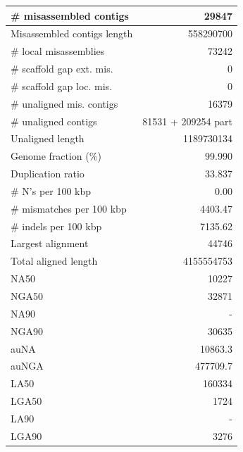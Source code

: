 \documentclass[12pt,a4paper]{article}
\begin{document}
\begin{table}[ht]
\begin{center}
\begin{tabular}{|l*{1}{|r}|}
\# misassembled contigs & 29847 \\ \hline
Misassembled contigs length & 558290700 \\ \hline
\# local misassemblies & 73242 \\ \hline
\# scaffold gap ext. mis. & 0 \\ \hline
\# scaffold gap loc. mis. & 0 \\ \hline
\# unaligned mis. contigs & 16379 \\ \hline
\# unaligned contigs & 81531 + 209254 part \\ \hline
Unaligned length & 1189730134 \\ \hline
Genome fraction (\%) & 99.990 \\ \hline
Duplication ratio & 33.837 \\ \hline
\# N's per 100 kbp & 0.00 \\ \hline
\# mismatches per 100 kbp & 4403.47 \\ \hline
\# indels per 100 kbp & 7135.62 \\ \hline
Largest alignment & 44746 \\ \hline
Total aligned length & 4155554753 \\ \hline
NA50 & 10227 \\ \hline
NGA50 & 32871 \\ \hline
NA90 & - \\ \hline
NGA90 & 30635 \\ \hline
auNA & 10863.3 \\ \hline
auNGA & 477709.7 \\ \hline
LA50 & 160334 \\ \hline
LGA50 & 1724 \\ \hline
LA90 & - \\ \hline
LGA90 & 3276 \\ \hline
\end{tabular}
\end{center}
\end{table}
\end{document}
